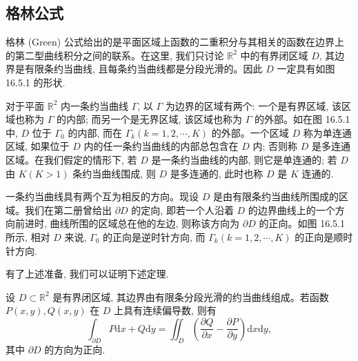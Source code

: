 \subsection{格林公式}
\label{subsec:ma-16-5-1}

格林 (Green) 公式给出的是平面区域上函数的二重积分与其相关的函数在边界上的第二型曲线积分之间的联系。在这里, 我们只讨论 $\mathbb R^2$ 中的有界闭区域 $D$, 其边界是有限条约当曲线, 且每条约当曲线都是分段光滑的。因此 $D$ 一定具有如图 16.5.1 的形状.

对于平面 $\mathbb R^2$ 内一条约当曲线 $\Gamma$, 以 $\Gamma$ 为边界的区域有两个: 一个是有界区域, 该区域也称为 $\Gamma$ 的内部; 而另一个是无界区域, 该区域也称为 $\Gamma$ 的外部。如在图 16.5.1 中, $D$ 位于 $\Gamma_0$ 的内部, 而在 $\Gamma_k(k=1,2,\cdots,K)$ 的外部。一个区域 $D$ 称为单连通区域, 如果位于 $D$ 内的任一条约当曲线的内部总包含在 $D$ 内; 否则称 $D$ 是多连通区域。在我们假定的情形下, 若 $D$ 是一条约当曲线的内部, 则它是单连通的; 若 $D$ 由 $K(K>1)$ 条约当曲线围成, 则 $D$ 是多连通的, 此时也称 $D$ 是 $K$ 连通的.

一条约当曲线具有两个互为相反的方向。现设 $D$ 是由有限条约当曲线所围成的区域。我们在第二册曾给出 $\partial D$ 的定向, 即若一个人沿着 $D$ 的边界曲线上的一个方向前进时, 曲线所围的区域总在他的左边, 则称该方向为 $\partial D$ 的正向。如图 16.5.1 所示, 相对 $D$ 来说, $\Gamma_0$ 的正向是逆时针方向, 而 $\Gamma_k(k=1,2,\cdots,K)$ 的正向是顺时针方向.

有了上述准备, 我们可以证明下述定理.

\begin{theorem}[{格林公式}]\label{theorem:ma-16-5-1}
设 $D\subset\mathbb R^2$ 是有界闭区域, 其边界由有限条分段光滑的约当曲线组成。若函数 $P(x,y),Q(x,y)$ 在 $D$ 上具有连续偏导数, 则有
\[
  \int_{\partial D}P\mathrm dx+Q\mathrm dy
  =\iint_D\left(\frac{\partial Q}{\partial x}-\frac{\partial P}{\partial y}\right)\mathrm dx\mathrm dy,
\]
其中 $\partial D$ 的方向为正向.
\end{theorem}


